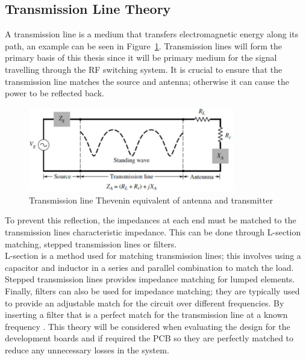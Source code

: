 \documentclass[12pt,openany,a4paper]{book}
\newcommand{\fig}[1]  {Figure~\ref{#1}}		%
\begin{document}
\subsection{Transmission Line Theory}	\label{sec:tran_theory}
A transmission line is a medium that transfers electromagnetic energy along its path, an example can be seen in \fig{fig:tline}. Transmission lines will form the primary basis of this thesis since it will be primary medium for the signal travelling through the RF switching system. It is crucial to ensure that the transmission line matches the source and antenna; otherwise it can cause the power to be reflected back. \newline
\begin{figure}[H]
	\centering
    \includegraphics[width=0.8\textwidth]{tline.png}
	\caption{Transmission line Thevenin equivalent of antenna and transmitter}
	\label{fig:tline}
\end{figure} 
To prevent this reflection, the impedances at each end must be matched to the transmission lines characteristic impedance. This can be done through L-section matching, stepped transmission lines or filters.  \\[0.2cm]
L-section is a method used for matching transmission lines; this involves using a capacitor and inductor in a series and parallel combination to match the load. Stepped transmission lines provides impedance matching for lumped elements. Finally, filters can also be used for impedance matching; they are typically used to provide an adjustable match for the circuit over different frequencies. By inserting a filter that is a perfect match for the transmission line at a known frequency \cite{ref9}. This theory will be considered when evaluating the design for the development boards and if required the PCB so they are perfectly matched to reduce any unnecessary losses in the system.
\end{document}
